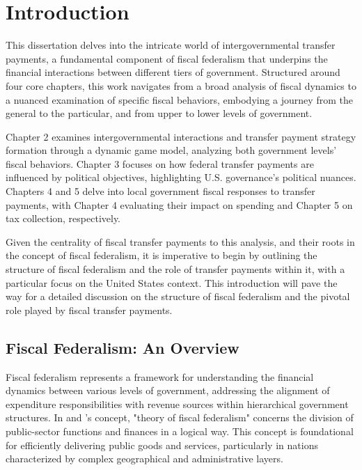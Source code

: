 
\chapter{Introduction} \label{chapter1:Introduction---about Fiscal Federalism and Intergovernmental Transfer}

This dissertation delves into the intricate world of intergovernmental transfer payments, a fundamental component of fiscal federalism that underpins the financial interactions between different tiers of government. Structured around four core chapters, this work navigates from a broad analysis of fiscal dynamics to a nuanced examination of specific fiscal behaviors, embodying a journey from the general to the particular, and from upper to lower levels of government.

Chapter 2 examines intergovernmental interactions and transfer payment strategy formation through a dynamic game model, analyzing both government levels' fiscal behaviors. Chapter 3 focuses on how federal transfer payments are influenced by political objectives, highlighting U.S. governance's political nuances. Chapters 4 and 5 delve into local government fiscal responses to transfer payments, with Chapter 4 evaluating their impact on spending and Chapter 5 on tax collection, respectively.


Given the centrality of fiscal transfer payments to this analysis, and their roots in the concept of fiscal federalism, it is imperative to begin by outlining the structure of fiscal federalism and the role of transfer payments within it, with a particular focus on the United States context. This introduction will pave the way for a detailed discussion on the structure of fiscal federalism and the pivotal role played by fiscal transfer payments.

\section{Fiscal Federalism: An Overview}

Fiscal federalism represents a framework for understanding the financial dynamics between various levels of government, addressing the alignment of expenditure responsibilities with revenue sources within hierarchical government structures. In \textcite{musgrave1971economics} and \textcite{oates1972fiscal}'s concept, "theory of fiscal federalism" concerns the division of public-sector functions and finances in a logical way. This concept is foundational for efficiently delivering public goods and services, particularly in nations characterized by complex geographical and administrative layers.

